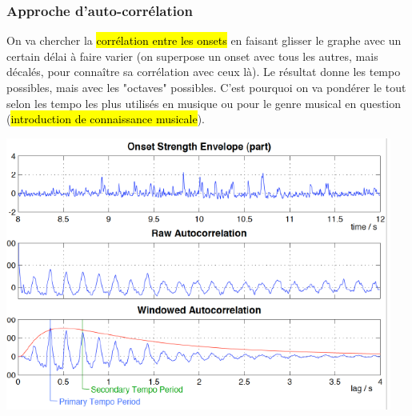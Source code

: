 \documentclass[letterpaper, 12pt]{article}
\newcommand{\alinea}{
\hspace*{0.5cm}}
\begin{document}
			\subsubsection{Approche d'auto-corrélation}
				\alinea On va chercher la\hl{ corrélation entre les onsets} en faisant glisser le graphe avec un certain délai à faire varier 
					(on superpose un onset avec tous les autres, mais décalés, pour connaître sa corrélation avec ceux là). 
					Le résultat donne les tempo possibles, mais avec les "octaves"
					possibles. C'est pourquoi on va pondérer le tout selon les tempo les plus utilisés en musique ou pour le genre musical en
					question (\hl{introduction de connaissance musicale}).
				\begin{center}
					\includegraphics[width=5in]{Images/tempo3}
				\end{center}
\end{document}
